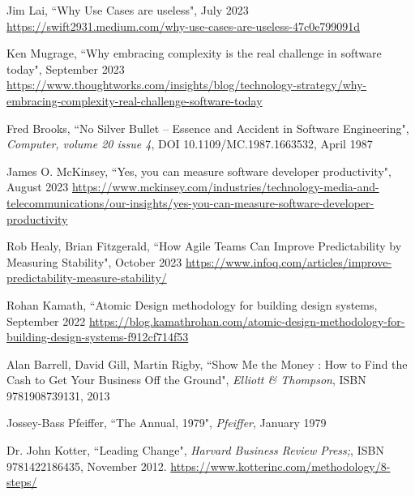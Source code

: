 \begin{thebibliography}{100}
 Jim Lai, ``Why Use Cases are useless", July 2023
\href{https://swift2931.medium.com/why-use-cases-are-useless-47c0e799091d}{https://swift2931.medium.com/why-use-cases-are-useless-47c0e799091d}

 Ken Mugrage, ``Why embracing complexity is the real challenge in software today", September 2023 
\href{https://www.thoughtworks.com/insights/blog/technology-strategy/why-embracing-complexity-real-challenge-software-today}{https://www.thoughtworks.com/insights/blog/technology-strategy/why-embracing-complexity-real-challenge-software-today}

 Fred Brooks, ``No Silver Bullet -- Essence and Accident in Software Engineering", 
\emph{Computer, volume 20 issue 4}, DOI 10.1109/MC.1987.1663532, April 1987

 James O. McKinsey, ``Yes, you can measure software developer productivity", August 2023
\href{https://www.mckinsey.com/industries/technology-media-and-telecommunications/our-insights/yes-you-can-measure-software-developer-productivity}{https://www.mckinsey.com/industries/technology-media-and-telecommunications/our-insights/yes-you-can-measure-software-developer-productivity}

 Rob Healy, Brian Fitzgerald, ``How Agile Teams Can Improve Predictability by Measuring 
Stability", October 2023 
\href{https://www.infoq.com/articles/improve-predictability-measure-stability/}{https://www.infoq.com/articles/improve-predictability-measure-stability/}

 Rohan Kamath, ``Atomic Design methodology for building design systems, September 2022
\href{https://blog.kamathrohan.com/atomic-design-methodology-for-building-design-systems-f912cf714f53}{https://blog.kamathrohan.com/atomic-design-methodology-for-building-design-systems-f912cf714f53}

 Alan Barrell, David Gill, Martin Rigby, ``Show Me the Money : How to Find the Cash to Get Your 
Business Off the Ground", \emph{Elliott \& Thompson}, ISBN 9781908739131, 2013

 Jossey-Bass Pfeiffer, ``The Annual, 1979", \emph{Pfeiffer}, January 1979

 Dr. John Kotter, ``Leading Change", \emph{Harvard Business Review Press;}, 
ISBN 9781422186435, November 2012.
\href{https://www.kotterinc.com/methodology/8-steps/}{https://www.kotterinc.com/methodology/8-steps/}


\end{thebibliography}
